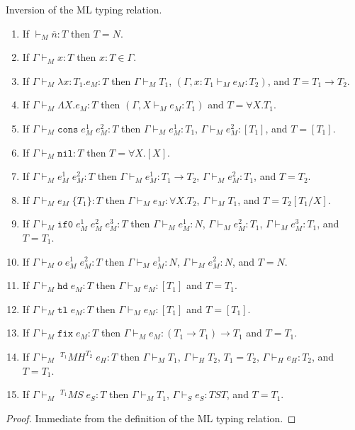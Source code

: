 \begin{mil}
\label{mil}
Inversion of the ML typing relation.
\begin{enumerate}
\item If $\vdash_{M}\overline{n}:T$ then $T=N$.
\item If $\Gamma\vdash_{M}x:T$ then $x:T\in\Gamma$.
\item If $\Gamma\vdash_{M}\lambda x:T_{1}.e_{M}:T$ then $\Gamma\vdash_{M}T_{1}$, $(\Gamma,x:T_{1}\vdash_{M}e_{M}:T_{2})$, and $T=T_{1}\rightarrow T_{2}$.
\item If $\Gamma\vdash_{M}\Lambda X.e_{M}:T$ then $(\Gamma,X\vdash_{M}e_{M}:T_{1})$ and $T=\forall X.T_{1}$.
\item If $\Gamma\vdash_{M}\mathtt{cons}\;e_{M}^{1}\;e_{M}^{2}:T$ then $\Gamma\vdash_{M}e_{M}^{1}:T_{1}$, $\Gamma\vdash_{M}e_{M}^{2}:[T_{1}]$, and $T=[T_{1}]$.
\item If $\Gamma\vdash_{M}\mathtt{nil}:T$ then $T=\forall X.[X]$.
\item If $\Gamma\vdash_{M}e_{M}^{1}\;e_{M}^{2}:T$ then $\Gamma\vdash_{M}e_{M}^{1}:T_{1}\rightarrow T_{2}$, $\Gamma\vdash_{M}e_{M}^{2}:T_{1}$, and $T=T_{2}$.
\item If $\Gamma\vdash_{M}e_{M}\;\lbrace T_{1}\rbrace:T$ then $\Gamma\vdash_{M}e_{M}:\forall X.T_{2}$, $\Gamma\vdash_{M}T_{1}$, and $T=T_{2}[T_{1}/X]$.
\item If $\Gamma\vdash_{M}\mathtt{if0}\;e_{M}^{1}\;e_{M}^{2}\;e_{M}^{3}:T$ then $\Gamma\vdash_{M}e_{M}^{1}:N$, $\Gamma\vdash_{M}e_{M}^{2}:T_{1}$, $\Gamma\vdash_{M}e_{M}^{3}:T_{1}$, and $T=T_{1}$.
\item If $\Gamma\vdash_{M}o\;e_{M}^{1}\;e_{M}^{2}:T$ then $\Gamma\vdash_{M}e_{M}^{1}:N$, $\Gamma\vdash_{M}e_{M}^{2}:N$, and $T=N$.
\item If $\Gamma\vdash_{M}\mathtt{hd}\;e_{M}:T$ then $\Gamma\vdash_{M}e_{M}:[T_{1}]$ and $T=T_{1}$.
\item If $\Gamma\vdash_{M}\mathtt{tl}\;e_{M}:T$ then $\Gamma\vdash_{M}e_{M}:[T_{1}]$ and $T=[T_{1}]$.
\item If $\Gamma\vdash_{M}\mathtt{fix}\;e_{M}:T$ then $\Gamma\vdash_{M}e_{M}:(T_{1}\rightarrow T_{1})\rightarrow T_{1}$ and $T=T_{1}$.
\item If $\Gamma\vdash_{M}\;^{T_{1}}MH^{T_{2}}\;e_{H}:T$ then $\Gamma\vdash_{M}T_{1}$, $\Gamma\vdash_{H}T_{2}$, $T_{1}=T_{2}$, $\Gamma\vdash_{H}e_{H}:T_{2}$, and $T=T_{1}$.
\item If $\Gamma\vdash_{M}\;^{T_{1}}MS\;e_{S}:T$ then $\Gamma\vdash_{M}T_{1}$, $\Gamma\vdash_{S}e_{S}:TST$, and $T=T_{1}$.
\end{enumerate}
\begin{proof}
Immediate from the definition of the ML typing relation.
\end{proof}
\end{mil}